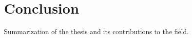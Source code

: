 \section{Conclusion}
\label{sec:conclusions}
Summarization of the thesis and its contributions to the field.


